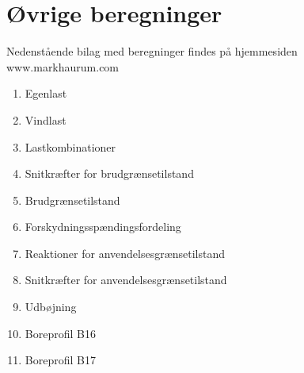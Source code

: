 \chapter{Øvrige beregninger}
Nedenstående bilag med beregninger findes på hjemmesiden www.markhaurum.com

\begin{enumerate}
	\item Egenlast
	\item Vindlast
	\item Lastkombinationer
	\item Snitkræfter for brudgrænsetilstand
	\item Brudgrænsetilstand
	\item Forskydningsspændingsfordeling
	\item Reaktioner for anvendelsesgrænsetilstand
	\item Snitkræfter for anvendelsesgrænsetilstand
	\item Udbøjning
	\item Boreprofil B16
	\item Boreprofil B17
\end{enumerate}